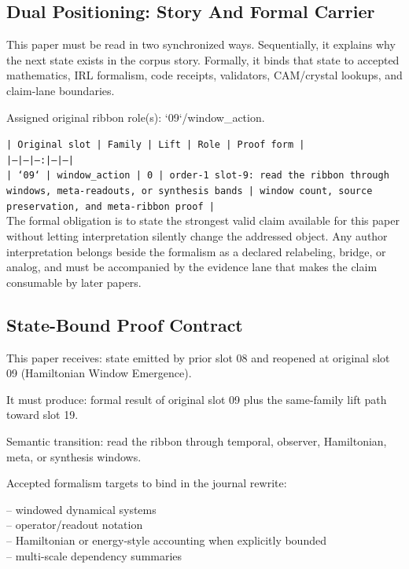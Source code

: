 \documentclass[11pt]{article}
\begin{document}
\subsection*{Dual Positioning: Story And Formal Carrier}

This paper must be read in two synchronized ways. Sequentially, it explains why
the next state exists in the corpus story. Formally, it binds that state to
accepted mathematics, IRL formalism, code receipts, validators, CAM/crystal
lookups, and claim-lane boundaries.

Assigned original ribbon role(s): `09`/window\_action.

\noindent\texttt{| Original slot | Family | Lift | Role | Proof form |}\\
\noindent\texttt{|---|---|---:|---|---|}\\
\noindent\texttt{| `09` | window\_action | 0 | order-1 slot-9: read the ribbon through windows, meta-readouts, or synthesis bands | window count, source preservation, and meta-ribbon proof |}\\

The formal obligation is to state the strongest valid claim available for this
paper without letting interpretation silently change the addressed object. Any
author interpretation belongs beside the formalism as a declared relabeling,
bridge, or analog, and must be accompanied by the evidence lane that makes the
claim consumable by later papers.

\subsection*{State-Bound Proof Contract}

This paper receives: state emitted by prior slot 08 and reopened at original slot 09 (Hamiltonian Window Emergence).

It must produce: formal result of original slot 09 plus the same-family lift path toward slot 19.

Semantic transition: read the ribbon through temporal, observer, Hamiltonian, meta, or synthesis windows.

Accepted formalism targets to bind in the journal rewrite:

\noindent{}-- windowed dynamical systems\\
\noindent{}-- operator/readout notation\\
\noindent{}-- Hamiltonian or energy-style accounting when explicitly bounded\\
\noindent{}-- multi-scale dependency summaries\\
\end{document}
